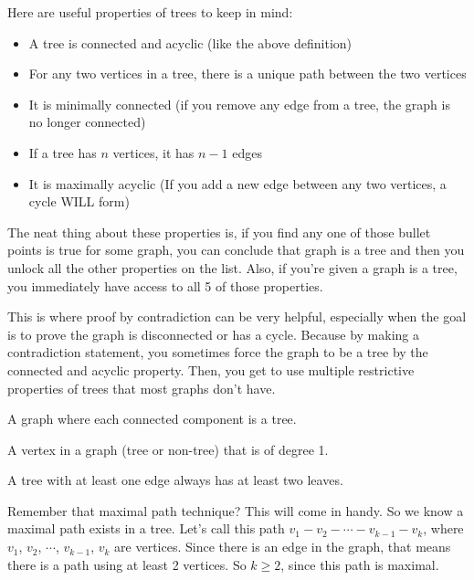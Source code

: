 \documentclass[11pt]{scrartcl}
\begin{document}
Here are useful properties of trees to keep in mind:
\begin{itemize}
    \item A tree is connected and acyclic (like the above definition)
    \item For any two vertices in a tree, there is a unique path between the two vertices
    \item It is minimally connected (if you remove any edge from a tree, the graph is no longer connected)
    \item If a tree has $n$ vertices, it has $n-1$ edges
    \item It is maximally acyclic (If you add a new edge between any two vertices, a cycle WILL form)
\end{itemize}
The neat thing about these properties is, if you find any one of those bullet points is true for some graph, you can conclude that graph is a tree and then you unlock all the other properties on the list. Also, if you're given a graph is a tree, you immediately have access to all 5 of those properties.

\begin{advice}
This is where proof by contradiction can be very helpful, especially when the goal is to prove the graph is disconnected or has a cycle. Because by making a contradiction statement, you sometimes force the graph to be a tree by the connected and acyclic property. Then, you get to use multiple restrictive properties of trees that most graphs don't have.
\end{advice}

\begin{definition}[Forest]
    A graph where each connected component is a tree.
\end{definition}

\begin{definition}[Leaf]
    A vertex in a graph (tree or non-tree) that is of degree 1.
\end{definition}


\begin{lemma}
    A tree with at least one edge always has at least two leaves.
\end{lemma}
Remember that maximal path technique? This will come in handy. So we know a maximal path exists in a tree. Let's call this path $v_1 - v_2 - \cdots - v_{k-1} - v_k$, where $v_1$, $v_2$, $\cdots$, $v_{k-1}$, $v_k$ are vertices. Since there is an edge in the graph, that means there is a path using at least 2 vertices. So $k \geq 2$, since this path is maximal.
\end{document}
